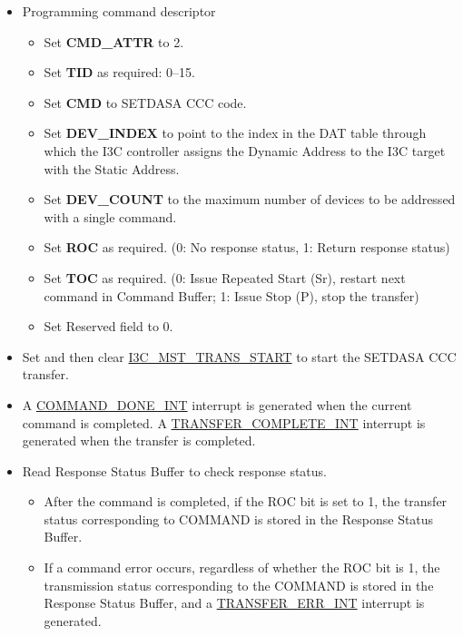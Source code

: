 \documentclass[main\_\_EN.tex]{subfiles}
\begin{document}
\begin{itemize}
    \item Programming command descriptor
    \begin{itemize}
        \item Set \textbf{CMD\_ATTR} to 2.
        \item Set \textbf{TID} as required: 0–15.
        \item Set \textbf{CMD} to SETDASA CCC code.
        \item Set \textbf{DEV\_INDEX} to point to the index in the DAT table through which the I3C controller assigns the Dynamic Address to the I3C target with the Static Address.
        \item Set \textbf{DEV\_COUNT} to the maximum number of devices to be addressed with a single command.
        \item Set \textbf{ROC} as required. (0: No response status, 1: Return response status)
        \item Set \textbf{TOC} as required. (0: Issue Repeated Start (Sr), restart next command in Command Buffer; 1: Issue Stop (P), stop the transfer)
        \item Set Reserved field to 0.
    \end{itemize}
    \item Set and then clear \hyperref[fielddesc:I3CMSTREGTRANSSTART]{I3C\_MST\_TRANS\_START} to start the SETDASA CCC transfer.
    \item A \hyperref[int:COMMANDDONEINT]{COMMAND\_DONE\_INT} interrupt is generated when the current command is completed. A \hyperref[int:TRANSFERCOMPLETEINT]{TRANSFER\_COMPLETE\_INT} interrupt is generated when the transfer is completed.
    \item Read Response Status Buffer to check response status.
    \begin{itemize}
        \item After the command is completed, if the ROC bit is set to 1, the transfer status corresponding to COMMAND is stored in the Response Status Buffer.
        \item If a command error occurs, regardless of whether the ROC bit is 1, the transmission status corresponding to the COMMAND is stored in the Response Status Buffer, and a \hyperref[int:TRANSFERERRINT]{TRANSFER\_ERR\_INT} interrupt is generated.
    \end{itemize}
\end{itemize}
\end{document}
